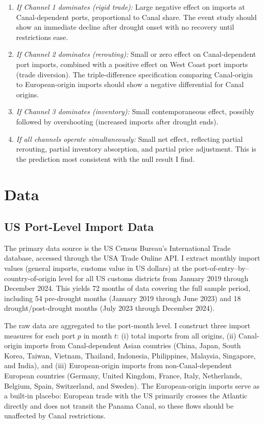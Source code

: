 \documentclass[12pt]{article}
\begin{document}
\begin{enumerate}
    \item \textit{If Channel 1 dominates (rigid trade):} Large negative effect on imports at Canal-dependent ports, proportional to Canal share. The event study should show an immediate decline after drought onset with no recovery until restrictions ease.
    \item \textit{If Channel 2 dominates (rerouting):} Small or zero effect on Canal-dependent port imports, combined with a positive effect on West Coast port imports (trade diversion). The triple-difference specification comparing Canal-origin to European-origin imports should show a negative differential for Canal origins.
    \item \textit{If Channel 3 dominates (inventory):} Small contemporaneous effect, possibly followed by overshooting (increased imports after drought ends).
    \item \textit{If all channels operate simultaneously:} Small net effect, reflecting partial rerouting, partial inventory absorption, and partial price adjustment. This is the prediction most consistent with the null result I find.
\end{enumerate}


\section{Data}
\label{sec:data}

\subsection{US Port-Level Import Data}

The primary data source is the US Census Bureau's International Trade database, accessed through the USA Trade Online API. I extract monthly import values (general imports, customs value in US dollars) at the port-of-entry--by--country-of-origin level for all US customs districts from January 2019 through December 2024. This yields 72 months of data covering the full sample period, including 54 pre-drought months (January 2019 through June 2023) and 18 drought/post-drought months (July 2023 through December 2024).

The raw data are aggregated to the port-month level. I construct three import measures for each port $p$ in month $t$: (i) total imports from all origins, (ii) Canal-origin imports from Canal-dependent Asian countries (China, Japan, South Korea, Taiwan, Vietnam, Thailand, Indonesia, Philippines, Malaysia, Singapore, and India), and (iii) European-origin imports from non-Canal-dependent European countries (Germany, United Kingdom, France, Italy, Netherlands, Belgium, Spain, Switzerland, and Sweden). The European-origin imports serve as a built-in placebo: European trade with the US primarily crosses the Atlantic directly and does not transit the Panama Canal, so these flows should be unaffected by Canal restrictions.
\end{document}

